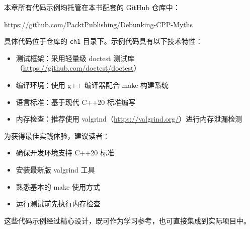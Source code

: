 本章所有代码示例均托管在本书配套的 GitHub 仓库中：

\url{https://github.com/PacktPublishing/Debunking-CPP-Myths}

具体代码位于仓库的 \texttt{ch1} 目录下。示例代码具有以下技术特性：

\begin{itemize}
\item 测试框架：采用轻量级 doctest 测试库（\url{https://github.com/doctest/doctest}）
\item 编译环境：使用 g++ 编译器配合 make 构建系统
\item 语言标准：基于现代 C++20 标准编写
\item 内存检查：推荐使用 valgrind（\url{https://valgrind.org/}）进行内存泄漏检测
\end{itemize}

为获得最佳实践体验，建议读者：
\begin{itemize}
\item 确保开发环境支持 C++20 标准
\item 安装最新版 valgrind 工具
\item 熟悉基本的 make 使用方式
\item 运行测试前先执行内存检查
\end{itemize}

这些代码示例经过精心设计，既可作为学习参考，也可直接集成到实际项目中。